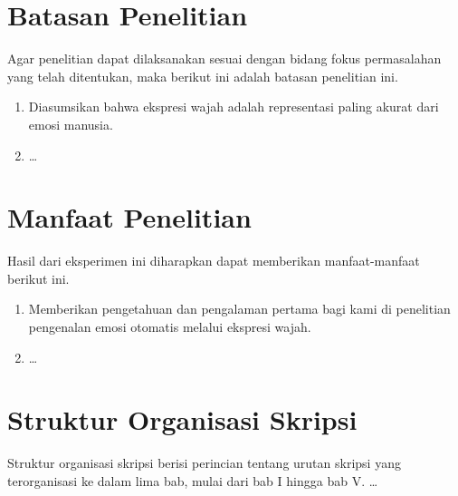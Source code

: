 \section{Batasan Penelitian}
Agar penelitian dapat dilaksanakan sesuai dengan bidang fokus permasalahan yang telah ditentukan, maka berikut ini adalah batasan penelitian ini.
\begin{enumerate}
    \item Diasumsikan bahwa ekspresi wajah adalah representasi paling akurat dari emosi manusia.
    \item \dots
\end{enumerate}

\section{Manfaat Penelitian}
Hasil dari eksperimen ini diharapkan dapat memberikan manfaat-manfaat berikut ini.
\begin{enumerate}
    \item Memberikan pengetahuan dan pengalaman pertama bagi kami di penelitian pengenalan emosi otomatis melalui ekspresi wajah.
    \item \dots
\end{enumerate}

\section{Struktur Organisasi Skripsi}
Struktur organisasi skripsi berisi perincian tentang urutan skripsi yang terorganisasi ke dalam lima bab, mulai dari bab I hingga bab V. \dots
